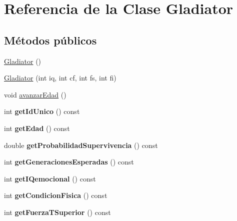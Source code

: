 \hypertarget{classGladiator}{}\section{Referencia de la Clase Gladiator}
\label{classGladiator}
\subsection*{Métodos públicos}
\begin{DoxyCompactItemize}
\item 
\hyperlink{classGladiator_aa795391070e17c3b16488c3c1f124aa2}{Gladiator} ()
\item 
\hyperlink{classGladiator_a12982a76511fc661e3124cdb8a1dbe38}{Gladiator} (int iq, int cf, int fs, int fi)
\item 
void \hyperlink{classGladiator_ab52778227a0a13255da3a826aecb20c4}{avanzar\+Edad} ()
\item 
\mbox{\label{classGladiator_aab314114a771280d793df23b5b1d0039}} 
int {\bfseries get\+Id\+Unico} () const
\item 
\mbox{\label{classGladiator_a421175244e54e2670c36b2f9194fe90c}} 
int {\bfseries get\+Edad} () const
\item 
\mbox{\label{classGladiator_a225bff1fee61b7d38a006588a0d0cba1}} 
double {\bfseries get\+Probabilidad\+Supervivencia} () const
\item 
\mbox{\label{classGladiator_a53f2ab03854f0a204ddfbac6fa5897f0}} 
int {\bfseries get\+Generaciones\+Esperadas} () const
\item 
\mbox{\label{classGladiator_a194881617fe40f5b5ac1242db3d31c4c}} 
int {\bfseries get\+I\+Qemocional} () const
\item 
\mbox{\label{classGladiator_a66bc1dc112e7c1b8293e65daeda05b4c}} 
int {\bfseries get\+Condicion\+Fisica} () const
\item 
\mbox{\label{classGladiator_afb0b1ca3a6960b45d6efe2ad6fd603c2}} 
int {\bfseries get\+Fuerza\+T\+Superior} () const
\item 
\mbox{\label{classGladiator_a665ea165cc81dfc03c95f61accd9aac9}} 

\end{DoxyCompactItemize}
